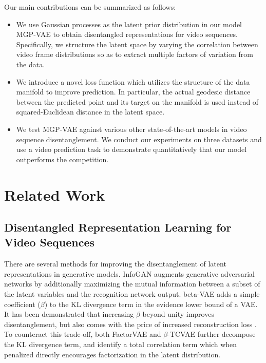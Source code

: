 \documentclass[runningheads]{llncs}
\begin{document}
   Our main contributions can be summarized as follows:
   \begin{itemize}
   \item We use Gaussian processes as the latent prior distribution in our model MGP-VAE to obtain disentangled representations for video sequences. Specifically, we structure the latent space by varying the correlation between video frame distributions so as to extract multiple factors of variation from the data. 
   \item We introduce a novel loss function which utilizes the structure of the data manifold to improve prediction. In particular, the actual geodesic distance between the predicted point and its target on the manifold is used instead of squared-Euclidean distance in the latent space.
   \item We test MGP-VAE against various other state-of-the-art models in video sequence disentanglement. We conduct our experiments on three datasets and use a video prediction task to demonstrate quantitatively that our model outperforms the competition.
   \end{itemize}
   
   \section{Related Work}
   
   \subsection{Disentangled Representation Learning for Video Sequences}
    There are several methods for improving the disentanglement of latent representations in generative models. InfoGAN \cite{infoGAN} augments generative adversarial networks \cite{GANs} by additionally maximizing the mutual information between a subset of the latent variables and the recognition network output. beta-VAE \cite{Higgins2017betaVAELB} adds a simple coefficient ($\beta$) to the KL divergence term in the evidence lower bound of a VAE. It has been demonstrated that increasing $\beta$ beyond unity improves disentanglement, but also comes with the price of increased reconstruction loss  \cite{Kim2018DisentanglingBF}. To counteract this trade-off, both FactorVAE \cite{Kim2018DisentanglingBF} and $\beta$-TCVAE \cite{tcVAE} further decompose the KL divergence term, and identify a total correlation term which when penalized directly encourages factorization in the latent distribution. \par 
\end{document}
